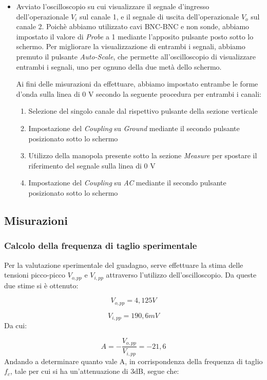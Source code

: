 \begin{itemize}
    \item Avviato l'oscilloscopio su cui visualizzare il segnale d'ingresso dell'operazionale $V_i$ sul canale 1, e il segnale di uscita dell'operazionale $V_o$ sul canale 2.
    Poichè abbiamo utilizzato cavi BNC-BNC e non sonde, abbiamo impostato il valore di \emph{Probe} a 1 mediante l'apposito pulsante posto sotto lo schermo.
    Per migliorare la visualizzazione di entrambi i segnali, abbiamo premuto il pulsante \emph{Auto-Scale}, che permette all'oscilloscopio di visualizzare entrambi i segnali, uno per ognuno della due metà dello schermo.
    
    Ai fini delle misurazioni da effettuare, abbiamo impostato entrambe le forme d'onda sulla linea di 0 V secondo la seguente procedura per entrambi i canali:
    \begin{enumerate}
        \item Selezione del singolo canale dal rispettivo pulsante della sezione verticale
        \item Impostazione del \emph{Coupling} su \textit{Ground} mediante il secondo pulsante posizionato sotto lo schermo
        \item Utilizzo della manopola presente sotto la sezione \textit{Measure} per spostare il riferimento del segnale sulla linea di 0 V
        \item Impostazione del \emph{Coupling} su \textit{AC} mediante il secondo pulsante posizionato sotto lo schermo  
\end{enumerate}
\end{itemize}


\subsection{Misurazioni}
\subsubsection{Calcolo della frequenza di taglio sperimentale}
Per la valutazione sperimentale del guadagno, serve effettuare la stima delle tensioni picco-picco \(V_{o,pp}\)
e \(V_{i, pp}\) attraverso l'utilizzo dell'oscilloscopio. Da queste due stime si è ottenuto:

\[V_{o,pp}=4,125V\]

\[V_{i, pp}=190,6mV\]
Da cui:

\[A=-\frac{V_{o,pp}}{V_{i, pp}}=-21,6\]
Andando a determinare quanto vale A, in corrispondenza della frequenza di taglio \(f_c\), tale per cui si ha un'attenuazione di 3dB, segue che:

